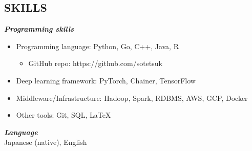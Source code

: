 \documentclass[margin, 10pt]{res} %
\begin{document}
\begin{resume}
\section{{\small SKILLS}}
{\sl {\bf Programming skills}} \vspace{0.5em}
\begin{itemize}
\item Programming language: Python, Go, C++, Java, R
  \begin{itemize}
  \item GitHub repo: https://github.com/sotetsuk
  \end{itemize}
\item Deep learning framework: PyTorch, Chainer, TensorFlow
\item Middleware/Infrastructure: Hadoop, Spark, RDBMS, AWS, GCP, Docker
\item Other tools: Git, SQL, LaTeX
\end{itemize}

{\sl {\bf Language}}\\
Japanese (native), English

\end{resume}
\end{document}
